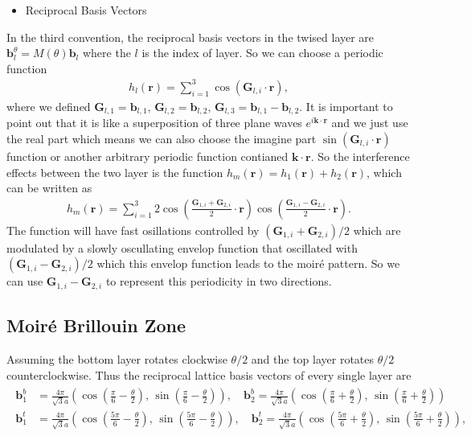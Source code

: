 \documentclass[10pt, oneside]{article}
\newcommand{\te}{\theta}
\newcommand{\p}[1]{\left(#1\right)}
\begin{document}
\begin{itemize}
	\item Reciprocal Basis Vectors
\end{itemize}
In the third convention, the reciprocal basis vectors in the twised layer are \(\bm{b}^{\te}_{l} = M \p{\te} \bm{b}_{l}\) where the \(l\) is the index of layer. So we can choose a periodic function 
\begin{align}
	h_{l} \p{\bm{r}} = \sum_{i = 1}^{3} \cos \p{\bm{G}_{l,i} \cdot \bm{r}},
\end{align}
where we defined \(\bm{G}_{l,1} = \bm{b}_{l,1}, \,\bm{G}_{l,2} = \bm{b}_{l,2}, \, \bm{G}_{l,3} = \bm{b}_{l,1} - \bm{b}_{l,2}\). It is important to point out that it is like a superposition of three plane waves \(e^{i \bm{k} \cdot \bm{r}}\) and we just use the real part which means we can also choose the imagine part \(\sin \p{\bm{G}_{l,i} \cdot \bm{r}}\) function or another arbitrary periodic function contianed \(\bm{k} \cdot \bm{r}\). So the interference effects between the two layer is the function \(h_{m}\p{\bm{r}} = h_{1} \p{\bm{r}} + h_{2} \p{\bm{r}}\), which can be written as 
\begin{align}
	h_{m}\p{\bm{r}} = \sum_{i = 1}^{3} 2 \cos \p{\frac{\bm{G}_{1,i} + \bm{G}_{2,i}}{2} \cdot \bm{r}} \cos \p{\frac{\bm{G}_{1,i} - \bm{G}_{2,i}}{2} \cdot \bm{r}}.
\end{align}
The function will have fast osillations controlled by \(\p{\bm{G}_{1,i} + \bm{G}_{2,i}}/2\) which are modulated by a slowly oscullating envelop function that oscillated with \(\p{\bm{G}_{1,i} - \bm{G}_{2,i}}/2\) which this envelop function leads to the moiré pattern. So we can use \(\bm{G}_{1,i} - \bm{G}_{2,i}\) to represent this periodicity in two directions.

\subsection{Moiré Brillouin Zone}
Assuming the bottom layer rotates clockwise \(\te/2\) and the top layer rotates \(\te/2\) counterclockwise. Thus the reciprocal lattice basis vectors of every single layer are
\begin{align}
	\begin{split}
		\bm{b}^{b}_{1} &= \frac{4 \pi}{\sqrt{3} a} \p{\cos\p{\frac{\pi}{6} - \frac{\te}{2}}, \, \sin\p{\frac{\pi}{6} - \frac{\te}{2}}},\quad \bm{b}^{b}_{2} =  \frac{4 \pi}{\sqrt{3} a} \p{\cos\p{\frac{\pi}{6} + \frac{\te}{2}}, \, \sin\p{\frac{\pi}{6} + \frac{\te}{2}}} \\
		\bm{b}^{t}_{1} &=  \frac{4 \pi}{\sqrt{3} a} \p{\cos\p{\frac{5\pi}{6} - \frac{\te}{2}}, \, \sin\p{\frac{5\pi}{6} - \frac{\te}{2}}},\quad \bm{b}^{t}_{2} =  \frac{4 \pi}{\sqrt{3} a} \p{\cos\p{\frac{5\pi}{6} + \frac{\te}{2}}, \, \sin\p{\frac{5\pi}{6} + \frac{\te}{2}}},
	\end{split}
\end{align}
\end{document}
